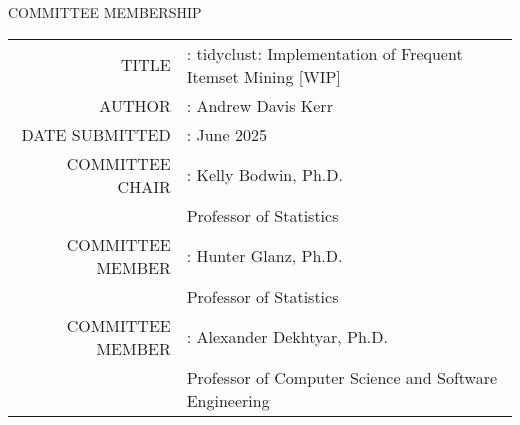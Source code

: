 \begin{center}
COMMITTEE MEMBERSHIP

\vspace{.5in}

\begin{tabular}{r@{}l}
TITLE & : \hspace*{1.5em}tidyclust: Implementation of Frequent Itemset Mining [WIP] \\[.5in]
AUTHOR & : \hspace*{1.5em}Andrew Davis Kerr \\[.5in]
DATE SUBMITTED & : \hspace*{1.5em}June 2025 \\[2in]
COMMITTEE CHAIR & : \hspace*{1.5em}Kelly Bodwin, Ph.D. \\
 & \hspace*{2.2em}Professor of Statistics \\[.5in]
COMMITTEE MEMBER & : \hspace*{1.5em}Hunter Glanz, Ph.D. \\
 & \hspace*{2.2em}Professor of Statistics \\[.5in]
COMMITTEE MEMBER & : \hspace*{1.5em}Alexander Dekhtyar, Ph.D. \\
 & \hspace*{2.2em}Professor of Computer Science and Software Engineering \\
\end{tabular}
\end{center}
\clearpage